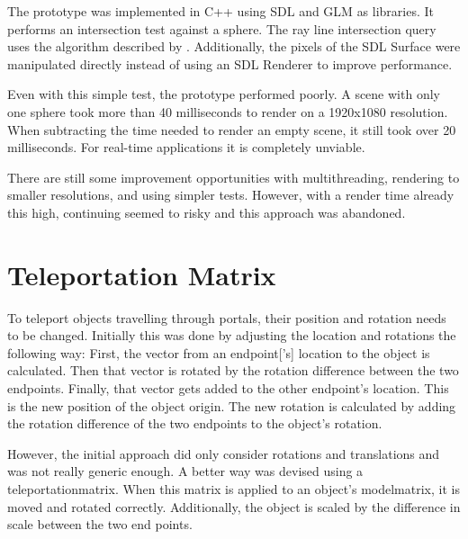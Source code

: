 The prototype was implemented in C++ using SDL \cite{sdl} and GLM \cite{glm} as libraries. It performs an intersection test against a sphere. The ray line intersection query uses the algorithm described by \textcite{eberly:2006:3d}. Additionally, the pixels of the SDL Surface were manipulated directly instead of using an SDL Renderer to improve performance.

Even with this simple test, the prototype performed poorly. A scene with only one sphere took more than 40 milliseconds to render on a 1920x1080 resolution. When subtracting the time needed to render an empty scene, it still took over 20 milliseconds. For real-time applications it is completely unviable.

There are still some improvement opportunities with multithreading, rendering to smaller resolutions, and using simpler tests. However, with a render time already this high, continuing seemed to risky and this approach was abandoned.








\section{Teleportation Matrix}
\label{section:teleportationmatrix}
To teleport objects travelling through portals, their position and rotation needs to be changed. Initially this was done by adjusting the location and rotations the following way: First, the vector from an \gls{endpoint}['s] location to the object is calculated. Then that vector is rotated by the rotation difference between the two \glspl{endpoint}. Finally, that vector gets added to the other endpoint's location. This is the new position of the object origin. The new rotation is calculated by adding the rotation difference of the two \glspl{endpoint} to the object's rotation.

However, the initial approach did only consider rotations and translations and was not really generic enough. A better way was devised using a \gls{teleportationmatrix}. When this matrix is applied to an object's \gls{modelmatrix}, it is moved and rotated correctly. Additionally, the object is scaled by the difference in scale between the two end points.





